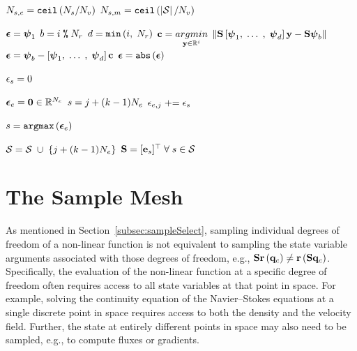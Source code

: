 \begin{enumerate}
\begin{algorithm}
\begin{algorithmic}
			\STATE $N_{s,e} = \mathtt{ceil}\left(N_s / N_{v} \right)$
			\STATE $N_{s,m} = \mathtt{ceil} \left( \left\vert \mathcal{S} \right\vert / N_{v} \right)$
			
	
					\STATE $\boldsymbol{\epsilon} = \boldsymbol{\psi}_1$
				\ELSE
					\STATE $b = i \; \text{\texttt{\%}} \; N_r$
					\STATE $d = \mathtt{min}\left(i, \; N_r \right)$
					\STATE $\mathbf{c} = \underset{\mathbf{y} \in \mathbb{R}^{i}}{argmin} \; \left\lVert\mathbf{S} \left[\boldsymbol{\psi}_1, \; \hdots \;, \; \boldsymbol{\psi}_{d} \right] \mathbf{y} - \mathbf{S} \boldsymbol{\psi}_{b}\right\rVert$
					\STATE $\boldsymbol{\epsilon} = \boldsymbol{\psi}_{b} - \left[\boldsymbol{\psi}_1, \; \hdots \;, \; \boldsymbol{\psi}_{d} \right] \mathbf{c}$
				\ENDIF
				\STATE $\boldsymbol{\epsilon} = \mathtt{abs}\left(\boldsymbol{\epsilon}\right)$
				
				\FORALL{$\sampIdx \in \sampSet$}
					\STATE $\epsilon_{s} = 0$ 
				\ENDFOR
	
				\STATE $\boldsymbol{\epsilon}_{e} = \mathbf{0} \in \mathbb{R}^{N_{e}}$
						\STATE $s = j + (k - 1) N_{e}$
						\STATE $\epsilon_{e,j} \mathrel{+}= \epsilon_{s}$ 
					\ENDFOR
				\ENDFOR
				
				\STATE $s = \mathtt{argmax} \left( \boldsymbol{\epsilon}_{e} \right)$
	
					\STATE $\mathcal{S} = \mathcal{S} \; \cup \; \{j + (k - 1) N_{e}\} $ 
				\ENDFOR
				\STATE $\mathbf{S} = [\mathbf{e}_{s}]^\top \; \forall \; s \in \mathcal{S}$
				
			\ENDFOR
		\end{algorithmic}
	\end{algorithm}

\end{enumerate}

\section{The Sample Mesh}\label{sec:sampleMesh}

As mentioned in Section~\ref{subsec:sampleSelect}, sampling individual degrees of freedom of a non-linear function is not equivalent to sampling the state variable arguments associated with those degrees of freedom, e.g., $\mathbf{S} \mathbf{r}\left(\mathbf{q}_{c}\right) \neq \mathbf{r}\left(\mathbf{S} \mathbf{q}_{c}\right)$. Specifically, the evaluation of the non-linear function at a specific degree of freedom often requires access to all state variables at that point in space. For example, solving the continuity equation of the Navier--Stokes equations at a single discrete point in space requires access to both the density and the velocity field. Further, the state at entirely different points in space may also need to be sampled, e.g., to compute fluxes or gradients.

